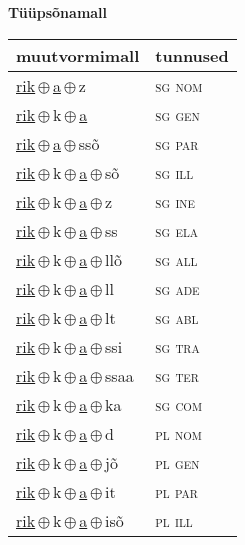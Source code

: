 

\vspace{3.5em}
\noindent \begin{minipage}{\textwidth}
\noindent \textbf{Tüüpsõnamall \,}\\

\begin{sideways}
\begin{tabular}{l l}
muutvormimall & tunnused \\
\hline
\underline{rik}\,$\oplus$\,\underline{a}\,$\oplus$\,z & \textsc{ sg nom } \\
\underline{rik}\,$\oplus$\,k\,$\oplus$\,\underline{a} & \textsc{ sg gen } \\
\underline{rik}\,$\oplus$\,\underline{a}\,$\oplus$\,ssõ & \textsc{ sg par } \\
\underline{rik}\,$\oplus$\,k\,$\oplus$\,\underline{a}\,$\oplus$\,sõ & \textsc{ sg ill } \\
\underline{rik}\,$\oplus$\,k\,$\oplus$\,\underline{a}\,$\oplus$\,z & \textsc{ sg ine } \\
\underline{rik}\,$\oplus$\,k\,$\oplus$\,\underline{a}\,$\oplus$\,ss & \textsc{ sg ela } \\
\underline{rik}\,$\oplus$\,k\,$\oplus$\,\underline{a}\,$\oplus$\,llõ & \textsc{ sg all } \\
\underline{rik}\,$\oplus$\,k\,$\oplus$\,\underline{a}\,$\oplus$\,ll & \textsc{ sg ade } \\
\underline{rik}\,$\oplus$\,k\,$\oplus$\,\underline{a}\,$\oplus$\,lt & \textsc{ sg abl } \\
\underline{rik}\,$\oplus$\,k\,$\oplus$\,\underline{a}\,$\oplus$\,ssi & \textsc{ sg tra } \\
\underline{rik}\,$\oplus$\,k\,$\oplus$\,\underline{a}\,$\oplus$\,ssaa & \textsc{ sg ter } \\
\underline{rik}\,$\oplus$\,k\,$\oplus$\,\underline{a}\,$\oplus$\,ka & \textsc{ sg com } \\
\underline{rik}\,$\oplus$\,k\,$\oplus$\,\underline{a}\,$\oplus$\,d & \textsc{ pl nom } \\
\underline{rik}\,$\oplus$\,k\,$\oplus$\,\underline{a}\,$\oplus$\,jõ & \textsc{ pl gen } \\
\underline{rik}\,$\oplus$\,k\,$\oplus$\,\underline{a}\,$\oplus$\,it & \textsc{ pl par } \\
\underline{rik}\,$\oplus$\,k\,$\oplus$\,\underline{a}\,$\oplus$\,isõ & \textsc{ pl ill } \\

\end{tabular}
\end{sideways}
\end{minipage}
